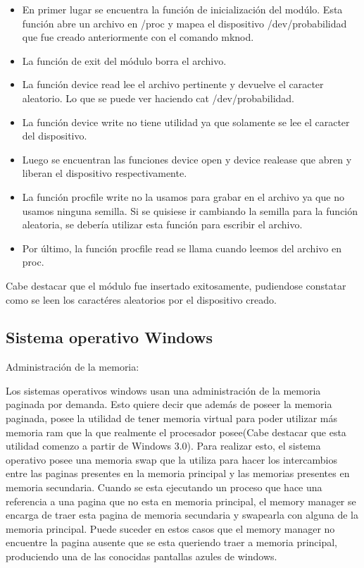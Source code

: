 \documentclass[a4paper, 12pt]{article}
\begin{document}
\begin{itemize}
\item En primer lugar se encuentra la funci\'on de inicializaci\'on del mod\'ulo. Esta funci\'on abre un archivo en /proc y mapea el dispositivo /dev/probabilidad que fue creado anteriormente con el comando mknod.
\item La funci\'on de exit del m\'odulo borra el archivo.
\item La funci\'on device read lee el archivo pertinente y devuelve el caracter aleatorio. Lo que se puede ver haciendo cat /dev/probabilidad.
\item La funci\'on device write no tiene utilidad ya que solamente se lee el caracter del dispositivo.
\item Luego se encuentran las funciones device open y device realease que abren y liberan el dispositivo respectivamente.
\item La funci\'on procfile write no la usamos para grabar en el archivo ya que no usamos ninguna semilla. Si se quisiese ir cambiando la semilla para la funci\'on aleatoria, se deber\'ia utilizar esta funci\'on para escribir el archivo.
\item Por \'ultimo, la funci\'on procfile read se llama cuando leemos del archivo en proc. 
\end{itemize}

Cabe destacar que el m\'odulo fue insertado exitosamente, pudiendose constatar como se leen los caract\'eres aleatorios por el dispositivo creado.


\subsection*{Sistema operativo Windows}

Administraci\'on de la memoria:

Los sistemas operativos windows usan una administraci\'on de la memoria paginada por demanda. Esto quiere decir que adem\'as de poseer la memoria paginada, posee la utilidad de tener memoria virtual para poder utilizar m\'as memoria ram que la que realmente el procesador posee(Cabe destacar que esta utilidad comenzo a partir de Windows 3.0). Para realizar esto, el sistema operativo posee una memoria swap que la utiliza para hacer los intercambios entre las paginas presentes en la memoria principal y las memorias presentes en memoria secundaria. Cuando se esta ejecutando un proceso que hace una referencia a una pagina que no esta en memoria principal, el memory manager se encarga de traer esta pagina de memoria secundaria y swapearla con alguna de la memoria principal. Puede suceder en estos casos que el memory manager no encuentre la pagina ausente que se esta queriendo traer a memoria principal, produciendo una de las conocidas pantallas azules de windows. 
\end{document}
